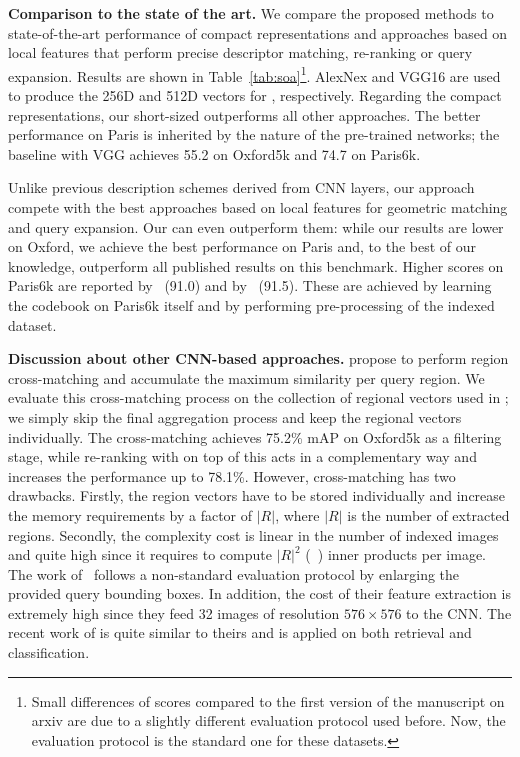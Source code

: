 \textbf{Comparison to the state of the art.}
We compare the proposed methods to state-of-the-art performance of compact representations and approaches based on local features that perform precise descriptor matching, re-ranking or query expansion.
Results are shown in Table~\ref{tab:soa}\footnote{Small differences of scores compared to the first version of the manuscript on arxiv are due to a slightly different evaluation protocol used before. Now, the evaluation protocol is the standard one for these datasets.}. AlexNex and VGG16 are used to produce the 256D and 512D vectors for \rfv, respectively.
Regarding the compact representations, our short-sized \rfv outperforms all other approaches.
The better performance on Paris is inherited by the nature of the pre-trained networks; the baseline \gfv with VGG achieves 55.2 on Oxford5k and 74.7 on Paris6k.

Unlike previous description schemes derived from CNN layers, our approach compete with the best
approaches based on local features for geometric matching and query expansion.
Our 
\deeploc can even outperform them: while our results are lower
on Oxford, we achieve the best performance on Paris and, to the best of our knowledge, outperform all published results on this benchmark.
Higher scores on Paris6k are reported by~\cite{AZ12} (91.0) and by~\cite{ZJS15} (91.5). These are achieved by learning the codebook on Paris6k itself and by performing pre-processing of the indexed dataset.


\textbf{Discussion about other CNN-based approaches.}
\cite{RSMC14} propose to perform region cross-matching and accumulate the maximum similarity per query region.
We evaluate this cross-matching process on the collection of regional vectors used in \rfv; we simply skip the final aggregation process and keep the regional vectors individually.
The cross-matching achieves 75.2\% mAP on Oxford5k as a filtering stage, while re-ranking with \deeploc on top of this acts in a complementary way and increases the performance up to 78.1\%. 
However, cross-matching has two drawbacks.
Firstly, the region vectors have to be stored individually and increase the memory requirements by a factor of $|R|$, where $|R|$ is the number of extracted regions.
Secondly, the complexity cost is linear in the number of indexed images and quite high since it requires to compute $|R|^2$ (~\citep{RSMC14}) inner products per image.
The work of~\cite{RSMC14} follows a non-standard evaluation protocol by enlarging the provided query bounding boxes.
In addition, the cost of their feature extraction is extremely high since they feed 32 images of resolution $576\times 576$ to the CNN.
The recent work of \cite{XTHZ15} is quite similar to theirs and is applied on both retrieval and classification.

